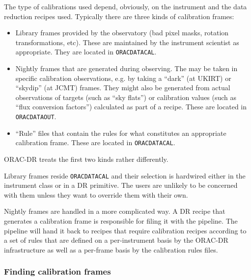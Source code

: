 \documentclass[twoside,11pt]{article}
\renewcommand{\_}{\texttt{\symbol{95}}}
\begin{document}
The type of calibrations used depend, obviously, on the instrument and
the data reduction recipes used. Typically there are three kinds of
calibration frames:

\begin{itemize}

\item 

Library frames provided by the observatory (bad pixel masks, rotation
transformations, etc).  These are maintained by the instrument
scientist as appropriate.  They are located in \texttt{ORAC\_DATA\_CAL}.


\item 

Nightly frames that are generated during observing.  The may be taken
in specific calibration observations, e.g. by taking a ``dark'' (at UKIRT)
or ``skydip'' (at JCMT) frames.  They might also be generated from
actual observations of targets (such as ``sky flats'') or
calibration values (such as ``flux conversion factors'') calculated
as part of a recipe.  These are located in \texttt{ORAC\_DATA\_OUT}.


\item 

``Rule'' files that contain the rules for what constitutes an
appropriate calibration frame.  These are located in \texttt{ORAC\_DATA\_CAL}.

\end{itemize}


ORAC-DR treats the first two kinds rather differently.



Library frames reside \texttt{ORAC\_DATA\_CAL} and their selection is hardwired
either in the instrument class or in a DR primitive.  The users are
unlikely to be concerned with them unless they want to override them
with their own.



Nightly frames are handled in a more complicated way.  A DR recipe
that generates a calibration frame is responsible for filing it with
the pipeline.  The pipeline will hand it back to recipes that require
calibration recipes according to a set of rules that are defined on a
per-instrument basis by the ORAC-DR infrastructure as well as a
per-frame basis by the calibration rules files.

\subsubsection*{Finding calibration frames\label{The_ORAC-DR_Calibration_Selection_Finding_calibration_frames}}
\end{document}
